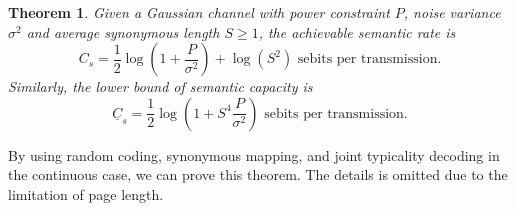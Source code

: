 \documentclass[12pt, draftclsnofoot,onecolumn]{IEEEtran}
\newtheorem{theorem}{\bf{Theorem}}
\begin{document}
\begin{theorem}
Given a Gaussian channel with power constraint $P$, noise variance $\sigma^2$ and average synonymous length $S\geq 1$, the achievable semantic rate is
\begin{equation}
C_s=\frac{1}{2}\log\left(1+\frac{P}{\sigma^2}\right)+\log(S^2) \text{ sebits per transmission}.
\end{equation}
Similarly, the lower bound of semantic capacity is
\begin{equation}
\underline{C}_s=\frac{1}{2}\log\left(1+S^4\frac{P}{\sigma^2}\right) \text{ sebits per transmission}.
\end{equation}
\end{theorem}

By using random coding, synonymous mapping, and joint typicality decoding in the continuous case, we can prove this theorem. The details is omitted due to the limitation of page length.
\end{document}
